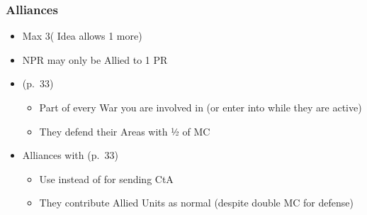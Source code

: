 \documentclass[10pt]{article}
\begin{document}
\subsubsection*{Alliances }
\begin{itemize}
	\item Max 3\alliances ( Idea allows 1 more)
	\item NPR may only be Allied to 1 PR
	\item {} (p.~33)
	\begin{itemize}
		\item Part of every War you are involved in (or enter into while they are active)
		\item They defend their Areas with ½ of MC
	\end{itemize}
	\item Alliances with  (p.~33)
	\begin{itemize}
		\item Use \colonists instead of \influence for sending CtA
		\item They contribute Allied Units as normal (despite double MC for defense)
	\end{itemize}
\end{itemize}
\end{document}
